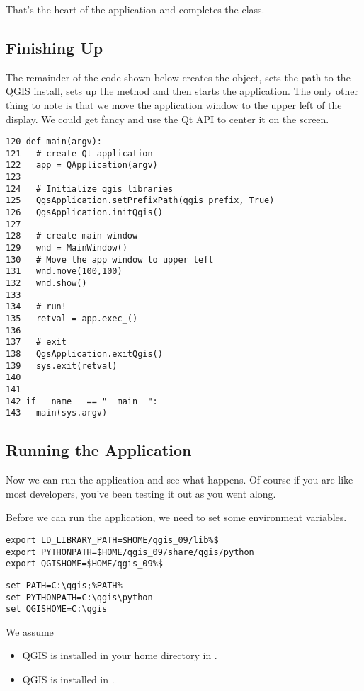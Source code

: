 That's the heart of the application and completes the  class. 

\subsection{Finishing Up}

The remainder of the code shown below 
creates the  object, sets the path to the QGIS install, 
sets up the  method and then starts the application. The only other 
thing to note is that we move the
application window to the upper left of the display. We could get fancy and 
use the Qt API to center it on the screen.

\begin{verbatim}
120 def main(argv):
121   # create Qt application
122   app = QApplication(argv)
123 
124   # Initialize qgis libraries
125   QgsApplication.setPrefixPath(qgis_prefix, True)
126   QgsApplication.initQgis()
127 
128   # create main window
129   wnd = MainWindow()
130   # Move the app window to upper left
131   wnd.move(100,100)
132   wnd.show()
133 
134   # run!
135   retval = app.exec_()
136   
137   # exit
138   QgsApplication.exitQgis()
139   sys.exit(retval)
140 
141 
142 if __name__ == "__main__":
143   main(sys.argv)
\end{verbatim}

\subsection{Running the Application}

Now we can run the application and see what happens. Of course if you are like 
most developers, you've been testing it out as you went along. 

Before we can run the application, we need to set some environment variables. 

\nix{}\osx{}
\begin{verbatim}
export LD_LIBRARY_PATH=$HOME/qgis_09/lib%$
export PYTHONPATH=$HOME/qgis_09/share/qgis/python
export QGISHOME=$HOME/qgis_09%$
\end{verbatim}

\win{}
\begin{verbatim}
set PATH=C:\qgis;%PATH%
set PYTHONPATH=C:\qgis\python
set QGISHOME=C:\qgis
\end{verbatim}

We assume
\begin{itemize}
\item\nix{}\osx{}QGIS is installed in 
your home directory in 
. 
\item\win{}QGIS is installed in .
\end{itemize}

